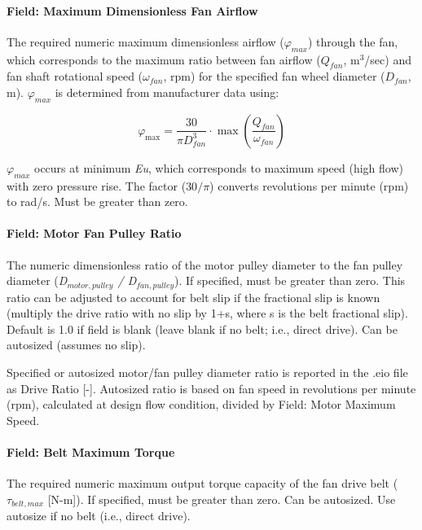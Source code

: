 \paragraph{Field: Maximum Dimensionless Fan Airflow}\label{field-maximum-dimensionless-fan-airflow}

The required numeric maximum dimensionless airflow (\(\varphi_{max}\)) through the fan, which corresponds to the maximum ratio between fan airflow (\(Q_{fan}\), m\(^{3}\)/sec) and fan shaft rotational speed (\(\omega_{fan}\), rpm) for the specified fan wheel diameter (\(D_{fan}\), m). \(\varphi_{max}\) is determined from manufacturer data using:

\begin{equation}
\varphi_{\max} = \frac{30}{\pi D_{fan}^3} \cdot \max \left( \frac{Q_{fan}}{\omega_{fan}} \right)
\end{equation}

\(\varphi_{max}\) occurs at minimum \emph{Eu}, which corresponds to maximum speed (high flow) with zero pressure rise. The factor (\(30/\pi\)) converts revolutions per minute (rpm) to rad/s. Must be greater than zero.

\paragraph{Field: Motor Fan Pulley Ratio}\label{field-motor-fan-pulley-ratio}

The numeric dimensionless ratio of the motor pulley diameter to the fan pulley diameter (\emph{D\(_{motor,pulley}\) / D\(_{fan,pulley}\)}). If specified, must be greater than zero. This ratio can be adjusted to account for belt slip if the fractional slip is known (multiply the drive ratio with no slip by 1+s, where s is the belt fractional slip). Default is 1.0 if field is blank (leave blank if no belt; i.e., direct drive). Can be autosized (assumes no slip).

Specified or autosized motor/fan pulley diameter ratio is reported in the .eio file as Drive Ratio {[}-{]}. Autosized ratio is based on fan speed in revolutions per minute (rpm), calculated at design flow condition, divided by Field: Motor Maximum Speed.

\paragraph{Field: Belt Maximum Torque}\label{field-belt-maximum-torque}

The required numeric maximum output torque capacity of the fan drive belt (\(\tau_{belt,max}\) {[}N-m{]}). If specified, must be greater than zero. Can be autosized. Use autosize if no belt (i.e., direct drive).

